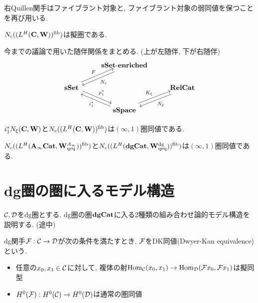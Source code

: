 \documentclass[uplatex, a4paper, 14Q, dvipdfmx]{jsarticle}
\begin{document}
右Quillen関手はファイブラント対象と, ファイブラント対象の弱同値を保つことを再び用いる.

\begin{corollary}
  $N_c((L^H(\mathbf{C},\mathbf{W}))^{\mathrm{fib}})$は擬圏である.
\end{corollary}

今までの議論で用いた随伴関係をまとめる. (上が左随伴, 下が右随伴)
\[\begin{tikzcd}
	& \ssetenriched \\
	\sset && \relcat \\
	& \sspace
	\arrow["{K_\xi}", shift left, from=3-2, to=2-3]
	\arrow["{p_1^\ast}", shift left, from=2-1, to=3-2]
	\arrow["{i_1^\ast}", shift left, from=3-2, to=2-1]
	\arrow["{N_\xi}", shift left, from=2-3, to=3-2]
	\arrow["{N_c}", shift left, from=1-2, to=2-1]
	\arrow["F", shift left, from=2-1, to=1-2]
\end{tikzcd}\]

\begin{theorem}
  $i_1^\ast N_\xi(\mathbf{C},\mathbf{W})$と$N_c((L^H(\mathbf{C},\mathbf{W}))^{\mathrm{fib}})$は$(\infty,1)$圏同値である. 
\end{theorem}

\begin{corollary}
  $N_c((L^H(\mathbf{A}_\infty\mathbf{Cat}, \mathbf{W}^{A_{\infty}}_\mathrm{qeq}))^{\mathrm{fib}})$と$N_c((L^H(\mathbf{dgCat}, \mathbf{W}^{\mathrm{dg}}_\mathrm{qeq}))^{\mathrm{fib}})$は$(\infty,1)$圏同値である. 
\end{corollary}


\section{dg圏の圏に入るモデル構造}

$\mathcal{C}, \mathcal{D}$をdg圏とする. 
dg圏の圏$\mathbf{dgCat}$に入る2種類の組み合わせ論的モデル構造を説明する. (途中)

\begin{definition}[DK同値]
  dg関手$\mathcal{F} : \mathcal{C} \to \mathcal{D}$が次の条件を満たすとき, $\mathcal{F}$をDK同値(Dwyer-Kan equivalence)という.
  \begin{itemize}
    \item 任意の$x_0,x_1 \in \mathcal{C}$に対して, 複体の射$\mathrm{Hom}_{\mathcal{C}}(x_0,x_1) \to \mathrm{Hom}_{\mathcal{D}}(\mathcal{F} x_0,\mathcal{F} x_1)$は擬同型
    \item $H^0(\mathcal{F}) : H^0(\mathcal{C}) \to H^0(\mathcal{D})$は通常の圏同値
  \end{itemize}
\end{definition}
\end{document}
